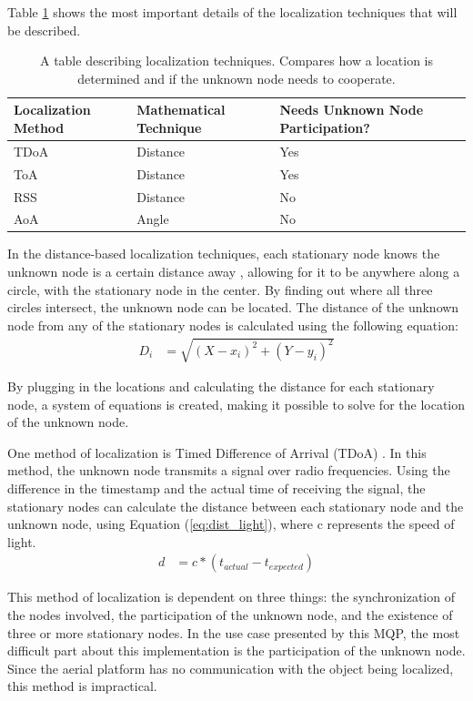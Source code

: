 Table \ref{table:local_methods} shows the most important details of the localization techniques that will be described. \par
\begin{table}[ht]
\centering
\caption{A table describing localization techniques. Compares how a location is determined and if the unknown node needs to cooperate.}
\label{table:local_methods}
\begin{tabular}{|l|l|l|}
    \hline
  Localization Method   & Mathematical Technique    & Needs Unknown Node Participation? \\ \hline
         TDoA           & Distance                  & Yes                                \\
          ToA           & Distance                  & Yes                                \\
          RSS           & Distance                  & No                                 \\
          AoA           & Angle                     & No                                 \\
    \hline
\end{tabular}
\end{table}\par

In the distance-based localization techniques, each stationary node knows the unknown node is a certain distance away \cite{local_conf}, allowing for it to be anywhere along a circle, with the stationary node in the center. By finding out where all three circles intersect, the unknown node can be located. The distance of the unknown node from any of the stationary nodes is calculated using the following equation: 
\begin{align}\label{eq:dist_coord}
D_i &=\sqrt{(X - x_i)^2 + (Y-y_i)^2}
\end{align}\par
By plugging in the locations and calculating the distance for each stationary node, a system of equations is created, making it possible to solve for the location of the unknown node.\par
One method of localization is Timed Difference of Arrival (TDoA) \cite{local_conf}. In this method, the unknown node transmits a signal over radio frequencies. Using the difference in the timestamp and the actual time of receiving the signal, the stationary nodes can calculate the distance between each stationary node and the unknown node, using Equation (\ref{eq:dist_light}), where c represents the speed of light.
\begin{align}\label{eq:dist_light} 
    d &= c*(t_{actual} - t_{expected}) 
\end{align} \par
This method of localization is dependent on three things: the synchronization of the nodes involved, the participation of the unknown node, and the existence of three or more stationary nodes. In the use case presented by this MQP, the most difficult part about this implementation is the participation of the unknown node. Since the aerial platform has no communication with the object being localized, this method is impractical. \par

